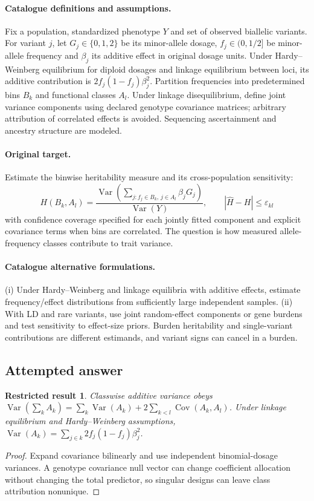 \documentclass[11pt]{article}
\DeclareMathOperator{\Var}{Var}
\DeclareMathOperator{\Cov}{Cov}
\providecommand{\Var}{\operatorname{Var}}
\providecommand{\Cov}{\operatorname{Cov}}
\newtheorem{attemptresult}{Restricted result}[section]
\begin{document}
\paragraph{Catalogue definitions and assumptions.}
Fix a population, standardized phenotype $Y$ and set of observed biallelic variants. For variant $j$, let $G_j\in\{0,1,2\}$ be its minor-allele dosage, $f_j\in(0,1/2]$ be minor-allele frequency and $\beta_j$ its additive effect in original dosage units. Under Hardy--Weinberg equilibrium for diploid dosages and linkage equilibrium between loci, its additive contribution is $2f_j(1-f_j)\beta_j^2$. Partition frequencies into predetermined bins $B_k$ and functional classes $A_l$. Under linkage disequilibrium, define joint variance components using declared genotype covariance matrices; arbitrary attribution of correlated effects is avoided. Sequencing ascertainment and ancestry structure are modeled.
\paragraph{Original target.}
Estimate the binwise heritability measure and its cross-population sensitivity:
\[
H(B_k,A_l)=\frac{\Var(\sum_{j:f_j\in B_k,\,j\in A_l}\beta_jG_j)}{\Var(Y)},
\qquad |\widehat H-H|\leq\varepsilon_{kl}
\]
with confidence coverage specified for each jointly fitted component and explicit covariance terms when bins are correlated. The question is how measured allele-frequency classes contribute to trait variance.
\paragraph{Catalogue alternative formulations.}
(i) Under Hardy--Weinberg and linkage equilibria with additive effects, estimate frequency/effect distributions from sufficiently large independent samples. (ii) With LD and rare variants, use joint random-effect components or gene burdens and test sensitivity to effect-size priors. Burden heritability and single-variant contributions are different estimands, and variant signs can cancel in a burden.
\subsection{Attempted answer}
\begin{attemptresult}
Classwise additive variance obeys $\Var(\sum_k A_k)=\sum_k\Var(A_k)+2\sum_{k<l}\Cov(A_k,A_l)$. Under linkage equilibrium and Hardy--Weinberg assumptions, $\Var(A_k)=\sum_{j\in k}2f_j(1-f_j)\beta_j^2$.
\end{attemptresult}
\begin{proof}
Expand covariance bilinearly and use independent binomial-dosage variances. A genotype covariance null vector can change coefficient allocation without changing the total predictor, so singular designs can leave class attribution nonunique.
\end{proof}
\end{document}
